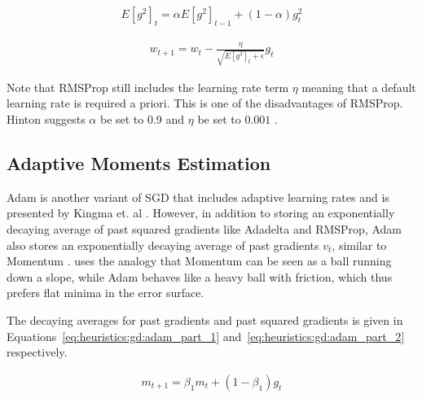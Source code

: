 \begin{equation}
      \label{eq:heuristics:gd:rmsprop_part_1}
      \begin{split}
            E[g^{2}]_{t} = \alpha E[g^{2}]_{t - 1} + (1 - \alpha)g_{t}^{2}
      \end{split}
\end{equation}

\begin{equation}
      \label{eq:heuristics:gd:rmsprop_part_2}
      \begin{split}
            w_{t+1} = w_{t} - \frac{\eta}{\sqrt{E[g^{2}]_{t} + \epsilon}} g_{t}
      \end{split}
\end{equation}

Note that \ac{RMSProp} still includes the learning rate term $\eta$ meaning that a default learning rate is required a priori. This is one of the disadvantages of \ac{RMSProp}. Hinton suggests $\alpha$ be set to 0.9 and $\eta$ be set to $0.001$ \cite{ref:hinton:2012}.


\subsection{Adaptive Moments Estimation}
\label{sec:heuristics:adam}

\Ac{Adam} is another variant of \ac{SGD} that includes adaptive learning rates and is presented by Kingma et. al \cite{ref:kingma:2014}. However, in addition to storing an exponentially decaying average of past squared gradients like \ac{Adadelta} and \ac{RMSProp}, \ac{Adam} also stores an exponentially decaying average of past gradients $v_{t}$, similar to \ac{Momentum} \cite{ref:ruder:2016}. \citeauthor{ref:heusel:2017} \cite{ref:heusel:2017} uses the analogy that \ac{Momentum} can be seen as a ball running down a slope, while \ac{Adam} behaves like a heavy ball with friction, which thus prefers flat minima in the error surface.

The decaying averages for past gradients and past squared gradients is given in Equations~\ref{eq:heuristics:gd:adam_part_1} and~\ref{eq:heuristics:gd:adam_part_2} respectively.

\begin{equation}
      \label{eq:heuristics:gd:adam_part_1}
      \begin{split}
            m_{t+1} = \beta_{1}m_{t} + (1 - \beta_{1})g_{t}
      \end{split}
\end{equation}


